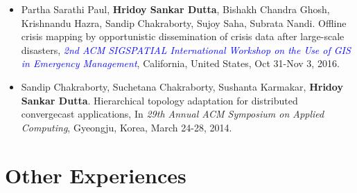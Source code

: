 \documentclass[margin, centered]{res}
\begin{document}
\begin{resume}
\begin{itemize}[leftmargin=*]
\item Partha Sarathi Paul, \textbf{Hridoy Sankar Dutta}, Bishakh Chandra Ghosh, Krishnandu Hazra, Sandip Chakraborty, Sujoy Saha, Subrata Nandi. Offline crisis mapping by opportunistic dissemination of crisis data after large-scale disasters, \textit{\textcolor{blue}{2nd ACM SIGSPATIAL International Workshop on the Use of GIS in Emergency Management}}, California, United States, Oct 31-Nov 3, 2016.

\item Sandip Chakraborty, Suchetana Chakraborty, Sushanta Karmakar, \textbf{Hridoy Sankar Dutta}. Hierarchical topology adaptation for distributed convergecast applications, In \textit{29th Annual ACM Symposium on Applied Computing}, Gyeongju, Korea, March 24-28, 2014.
\end{itemize}

\section{Other Experiences}


\end{resume}
\end{document}
